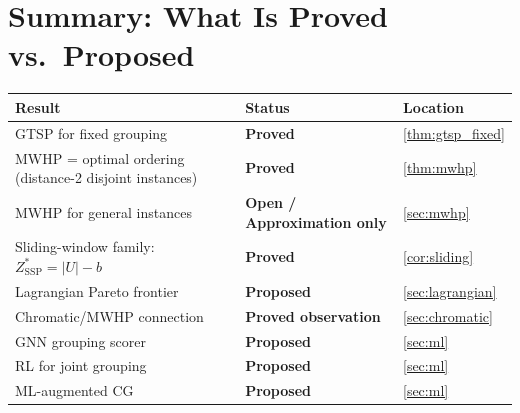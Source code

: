 \documentclass[11pt,a4paper]{article}
\theoremstyle{plain}
\theoremstyle{definition}
\newcommand{\ZSSP}{Z_{\mathrm{SSP}}^*}
\begin{document}
\section{Summary: What Is Proved vs.\ Proposed}
\label{sec:summary}

\begin{center}
\begin{tabular}{lll}
\toprule
Result & Status & Location \\
\midrule
GTSP for fixed grouping & \textbf{Proved} & \cref{thm:gtsp_fixed} \\
MWHP = optimal ordering (distance-2 disjoint instances) & \textbf{Proved} & \cref{thm:mwhp} \\
MWHP for general instances & \textbf{Open / Approximation only} & \cref{sec:mwhp} \\
Sliding-window family: $\ZSSP = |U|-b$ & \textbf{Proved} & \cref{cor:sliding} \\
Lagrangian Pareto frontier & \textbf{Proposed} & \cref{sec:lagrangian} \\
Chromatic/MWHP connection & \textbf{Proved observation} & \cref{sec:chromatic} \\
GNN grouping scorer & \textbf{Proposed} & \cref{sec:ml} \\
RL for joint grouping & \textbf{Proposed} & \cref{sec:ml} \\
ML-augmented CG & \textbf{Proposed} & \cref{sec:ml} \\
\bottomrule
\end{tabular}
\end{center}



\end{document}
